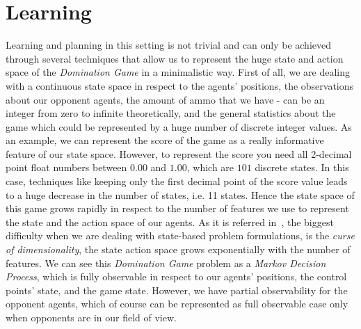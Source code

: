 \documentclass[conference]{IEEEtran}
\begin{document}









%
\IEEEpeerreviewmaketitle



\section{Learning}
Learning and planning in this setting is not trivial and can only be achieved through several techniques that allow us to represent the huge state and action space of the \textit{Domination Game} in a minimalistic way. First of all, we are dealing with a continuous state space in respect to the agents' positions, the observations about our opponent agents, the amount of ammo that we have - can be an integer from zero to infinite theoretically, and the general statistics about the game which could be represented by a huge number of discrete integer values. As an example, we can represent the score of the game as a really informative feature of our state space. However, to represent the score you need all 2-decimal point float numbers between $0.00$ and $1.00$, which are $101$ discrete states. In this case, techniques like keeping only the first decimal point of the score value leads to a huge decrease in the number of states, i.e. 11 states. Hence the state space of this game grows rapidly in respect to the number of features we use to represent the state and the action space of our agents. As it is referred in~\cite{boutilier2011decision}, the biggest difficulty when we are dealing with state-based problem formulations, is the \textit{curse of dimensionality}, the state action space grows exponentially with the number of features. We can see this \textit{Domination Game} problem as a \textit{Markov Decision Process}, which is fully observable in respect to our agents' positions, the control points' state, and the game state. However, we have partial observability for the opponent agents, which of course can be represented as full observable case only when opponents are in our field of view.
\end{document}
